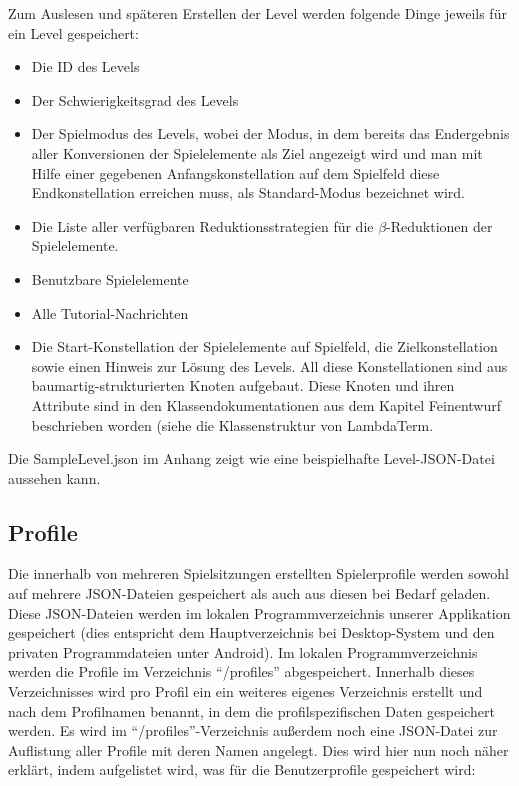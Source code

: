 Zum Auslesen und späteren Erstellen der Level werden folgende Dinge jeweils für ein Level gespeichert: 
\begin{itemize}
	\item Die ID des Levels
	\item Der Schwierigkeitsgrad des Levels
	\item Der Spielmodus des Levels, wobei der Modus, in dem bereits das Endergebnis aller Konversionen der Spielelemente als Ziel angezeigt wird und man mit Hilfe einer gegebenen Anfangskonstellation auf dem Spielfeld diese Endkonstellation erreichen muss, als Standard-Modus bezeichnet wird.
	\item Die Liste aller verfügbaren Reduktionsstrategien für die $\beta$-Reduktionen der Spielelemente.
	\item Benutzbare Spielelemente
	\item Alle Tutorial-Nachrichten
	\item Die Start-Konstellation der Spielelemente auf Spielfeld, die Zielkonstellation sowie einen Hinweis zur Lösung des Levels. All diese Konstellationen sind aus baumartig-strukturierten Knoten aufgebaut. Diese Knoten und ihren Attribute sind in den Klassendokumentationen aus dem Kapitel Feinentwurf beschrieben worden (siehe die Klassenstruktur von LambdaTerm.	
\end{itemize}

Die SampleLevel.json im Anhang zeigt wie eine beispielhafte Level-JSON-Datei aussehen kann.


\subsection{Profile}

Die innerhalb von mehreren Spielsitzungen erstellten Spielerprofile werden sowohl auf mehrere JSON-Dateien gespeichert als auch aus diesen bei Bedarf geladen. Diese JSON-Dateien werden im lokalen Programmverzeichnis unserer Applikation gespeichert (dies entspricht dem Hauptverzeichnis bei Desktop-System und den privaten Programmdateien unter Android). Im lokalen Programmverzeichnis werden die Profile im Verzeichnis "`/profiles"' abgespeichert. Innerhalb dieses Verzeichnisses wird pro Profil ein ein weiteres eigenes Verzeichnis erstellt und nach dem Profilnamen benannt, in dem die profilspezifischen Daten gespeichert werden. Es wird im "`/profiles"'-Verzeichnis außerdem noch eine JSON-Datei zur Auflistung aller Profile mit deren Namen angelegt. Dies wird hier nun noch näher erklärt, indem aufgelistet wird, was für die Benutzerprofile gespeichert wird:

